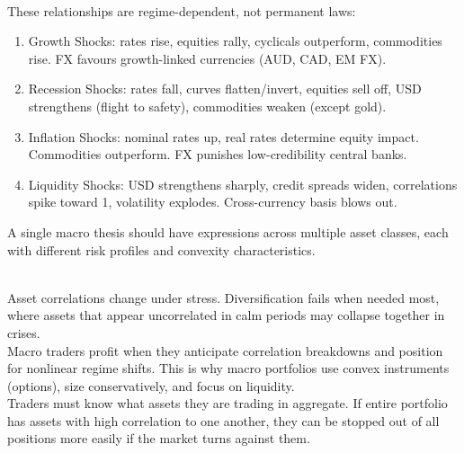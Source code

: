 \documentclass[a4paper,oneside,openany]{book}
\begin{document}
\begin{remark} \\
These relationships are regime-dependent, not permanent laws:
\begin{enumerate}[label=\roman*.]
\setlength{\itemsep}{0pt}
\item Growth Shocks: rates rise, equities rally, cyclicals outperform, commodities rise. FX favours growth-linked currencies (AUD, CAD, EM FX).
\item Recession Shocks: rates fall, curves flatten/invert, equities sell off, USD strengthens (flight to safety), commodities weaken (except gold).
\item Inflation Shocks: nominal rates up, real rates determine equity impact. Commodities outperform. FX punishes low-credibility central banks.
\item Liquidity Shocks: USD strengthens sharply, credit spreads widen, correlations spike toward 1, volatility explodes. Cross-currency basis blows out.
\end{enumerate}
A single macro thesis should have expressions across multiple asset classes, each with different risk profiles and convexity characteristics.
\end{remark}

\begin{remark} \\
Asset correlations change under stress. Diversification fails when needed most, where assets that appear uncorrelated in calm periods may collapse together in crises.\\
Macro traders profit when they anticipate correlation breakdowns and position for nonlinear regime shifts. This is why macro portfolios use convex instruments (options), size conservatively, and focus on liquidity.\\
Traders must know what assets they are trading in aggregate. If entire portfolio has assets with high correlation to one another, they can be stopped out of all positions more easily if the market turns against them.
\end{remark}
\end{document}
